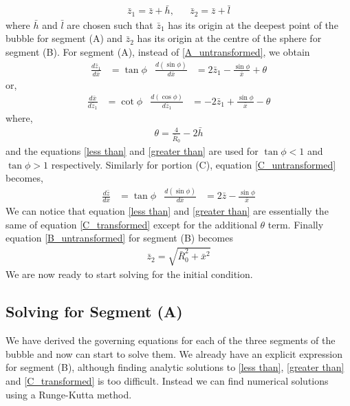 \begin{align}
    \bar{z}_1 = \bar{z}+\bar{h}, && \bar{z}_2=\bar{z}+\bar{l}
\end{align}
where $\bar{h}$ and $\bar{l}$ are chosen such that $\bar{z}_1$ has its origin at the deepest point of the bubble for segment (A) and $\bar{z}_2$ has its origin at the centre of the sphere for segment (B). For segment (A), instead of \ref{A_untransformed}, we obtain
\begin{align}\label{less than}
    \frac{d\bar{z}_1}{d\bar{x}} &= \tan \phi &
    \frac{d(\sin\phi)}{d\bar{x}} &= 2\bar{z}_1 - \frac{\sin\phi}{\bar{x}} + \theta
\end{align}
or,
\begin{align}\label{greater than}
    \frac{d\bar{x}}{d\bar{z}_1} &= \cot \phi & 
    \frac{d(\cos\phi)}{d\bar{z}_1} &= -2\bar{z}_1 + \frac{\sin\phi}{\bar{x}} - \theta
\end{align}
where,
\begin{align}
    \theta = \frac{4}{\bar{R}_0} - 2\bar{h}
\end{align}
and the equations \ref{less than} and \ref{greater than} are used for $\tan\phi <1$ and $\tan\phi >1$ respectively. Similarly for portion (C), equation \ref{C_untransformed} becomes,
\begin{align}\label{C_transformed}
    \frac{d\bar{z}}{d\bar{x}} &= \tan \phi &
    \frac{d(\sin\phi)}{d\bar{x}} &= 2\bar{z} - \frac{\sin\phi}{\bar{x}}
\end{align}
We can notice that equation \ref{less than} and \ref{greater than} are essentially the same of equation \ref{C_transformed} except for the additional $\theta$ term. Finally equation \ref{B_untransformed} for segment (B) becomes
\begin{align}\label{Eq_B}
    \bar{z}_2 = \sqrt{ \bar{R}_0^2+\bar{x}^2}
\end{align}
We are now ready to start solving for the initial condition.

\subsection{Solving for Segment (A)}

We have derived the governing equations for each of the three segments of the bubble and now can start to solve them. We already have an explicit expression for segment (B), although finding analytic solutions to \ref{less than}, \ref{greater than} and \ref{C_transformed} is too difficult. Instead we can find numerical solutions using a Runge-Kutta method.

